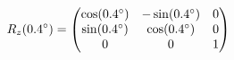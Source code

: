 \documentclass[preview]{standalone}
\begin{document}
\begin{align*}
\special{dvisvgm:raw <g id='unique000'>}R_z(0.4^\circ) = \begin{pmatrix} \cos(0.4^\circ) & -\sin(0.4^\circ) & 0 \\ \sin(0.4^\circ) & \cos(0.4^\circ) & 0 \\ 0 & 0 & 1 \end{pmatrix}\special{dvisvgm:raw </g>}
\end{align*}
\end{document}
